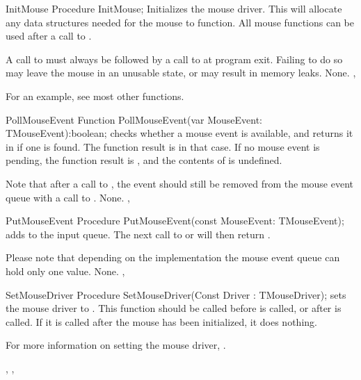 
\begin{procedure}{InitMouse}
\Declaration
Procedure InitMouse;
\Description
{} Initializes the mouse driver. This will allocate any data
structures needed for the mouse to function. All mouse functions can be
used after a call to .

A call to  must always be followed by a call to 
at program exit. Failing to do so may leave the mouse in an unusable state,
or may result in memory leaks.
\Errors
None.
\SeeAlso
{}, 
\end{procedure}

For an example, see most other functions.

\begin{function}{PollMouseEvent}
\Declaration
Function PollMouseEvent(var MouseEvent: TMouseEvent):boolean; 
\Description
{} checks whether a mouse event is available, and 
returns it in  if one is found. The function result is
 in that case. If no mouse event is pending, the function result
is , and the contents of  is undefined.

Note that after a call to , the event should still 
be removed from the mouse event queue with a call to .
\Errors
None.
\SeeAlso
{}, 
\end{function}

\begin{procedure}{PutMouseEvent}
\Declaration
Procedure PutMouseEvent(const MouseEvent: TMouseEvent);
\Description
{} adds  to the input queue. The next
call to  or  will then return
. 

Please note that depending on the implementation the mouse event queue
can hold only one value.
\Errors
None.
\SeeAlso
{}, 
\end{procedure}

\begin{procedure}{SetMouseDriver}
\Declaration
Procedure SetMouseDriver(Const Driver : TMouseDriver);
\Description
{} sets the mouse driver to . This function
should be called before  is called, or after 
is called. If it is called after the mouse has been initialized, it does
nothing.

For more information on setting the mouse driver, .
\Errors

\SeeAlso
{}, , 
\end{procedure}

